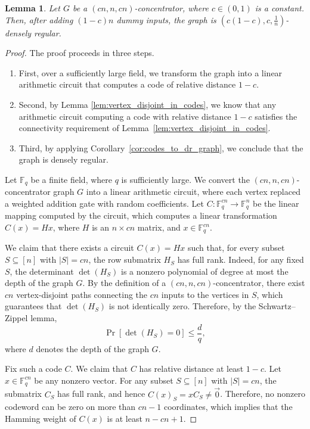 \documentclass[11pt]{article}
\newtheorem{lemma}{Lemma}
\begin{document}
\begin{lemma}
\label{lem:concentrator_is_dr}
Let $G$ be a $(cn, n, cn)$-concentrator, where $c \in (0,1)$ is a constant. Then, after adding $(1-c)n$ dummy inputs, the graph is $(c(1-c), c, \tfrac{1}{n})$-densely regular.
\end{lemma}
\begin{proof} The proof proceeds in three steps. 
\begin{enumerate}
\item First, over a sufficiently large field, we transform the graph into a linear arithmetic circuit that computes a code of relative distance \(1-c\).
\item Second, by Lemma \ref{lem:vertex_disjoint_in_codes}, we know that any arithmetic circuit computing a code with relative distance \(1-c\) satisfies the connectivity requirement of Lemma~\ref{lem:vertex_disjoint_in_codes}.
\item Third, by applying Corollary~\ref{cor:codes_to_dr_graph}, we conclude that the graph is densely regular.
\end{enumerate}

Let $\mathbb{F}_q$ be a finite field, where $q$ is sufficiently large. We convert the $(cn, n, cn)$-concentrator graph $G$ into a linear arithmetic circuit, where each vertex replaced a weighted addition gate with random coefficients. Let $C:\mathbb{F}_q^{cn} \to \mathbb{F}_q^n$ be the linear mapping computed by the circuit, which computes a linear transformation $C(x) = Hx$, where $H$ is an $n \times cn$ matrix, and $x \in \mathbb{F}_q^{cn}$.

We claim that there exists a circuit \(C(x)=Hx\) such that, for every subset
\(S \subseteq [n]\) with \(|S| = cn\), the row submatrix \(H_S\) has full rank.
Indeed, for any fixed \(S\), the determinant \(\det(H_S)\) is a nonzero polynomial of degree at most the depth of the graph \(G\).
By the definition of a \((cn,n,cn)\)-concentrator, there exist \(cn\) vertex-disjoint paths connecting the \(cn\) inputs to the vertices in \(S\), which guarantees that \(\det(H_S)\) is not identically zero.
Therefore, by the Schwartz--Zippel lemma,
\[
\Pr[\det(H_S)=0] \le \frac{d}{q},
\]
where \(d\) denotes the depth of the graph \(G\).

Fix such a code \(C\). We claim that \(C\) has relative distance at least \(1-c\). Let \(x \in \mathbb{F}_q^{cn}\) be any nonzero vector. For any subset \(S \subseteq [n]\) with \(|S| = cn\), the submatrix \(C_S\) has full rank, and
hence \(C(x)_S = x C_S \neq \vec{0}\). Therefore, no nonzero codeword can be zero on more than \(cn-1\) coordinates, which implies that the Hamming weight of \(C(x)\) is at least \(n - cn + 1\). 


\end{proof}
\end{document}
